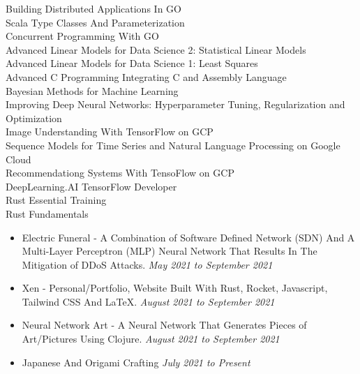 \documentclass{myresume}
\begin{document}
        {Building Distributed Applications In GO} \\
        {Scala Type Classes And Parameterization} \\
        {Concurrent Programming With GO} \\
        {Advanced Linear Models for Data Science 2: Statistical Linear Models} \\
        {Advanced Linear Models for Data Science 1: Least Squares} \\
        {Advanced C Programming Integrating C and Assembly Language} \\
        {Bayesian Methods for Machine Learning} \\
        {Improving Deep Neural Networks: Hyperparameter Tuning, Regularization and Optimization} \\
        {Image Understanding With TensorFlow on GCP} \\
        {Sequence Models for Time Series and Natural Language Processing on Google Cloud} \\
        {Recommendationg Systems With TensoFlow on GCP} \\
        {DeepLearning.AI TensorFlow Developer} \\
        {Rust Essential Training} \\
        {Rust Fundamentals} \\
        
       \begin{itemize}
     	\item Electric Funeral - A Combination of Software Defined Network (SDN) And A Multi-Layer Perceptron (MLP) Neural Network That Results In The Mitigation of DDoS Attacks. \textit{May 2021 to September 2021}
     	\item Xen - Personal/Portfolio, Website Built With Rust, Rocket, Javascript, Tailwind CSS And \LaTeX{}. \textit{August 2021 to September 2021}
     	\item Neural Network Art -  A Neural Network That Generates Pieces of Art/Pictures Using Clojure. \textit{August 2021 to September 2021}
       \end{itemize}   
 
        \begin{itemize}
                \item Japanese And Origami Crafting \textit{July 2021 to Present}
        \end{itemize}
\end{document}
